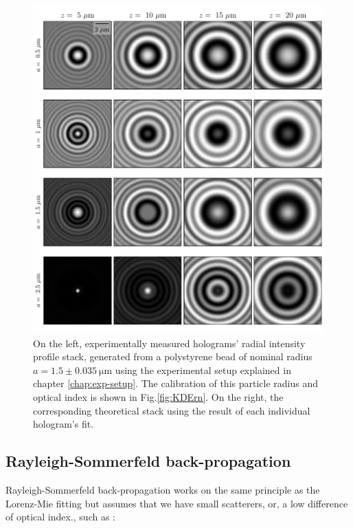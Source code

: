 \begin{figure}
	\centering
	\includegraphics{02_body/chapter2/images/holo_size_exemple/holos_fix_n.pdf}
	\caption{On the left, experimentally measured  holograms' radial intensity profile stack, generated from a polystyrene bead of nominal radius $a = 1.5 \pm 0.035 ~ \mathrm{\mu m} $ using the experimental setup explained in chapter \ref{chap:exp-setup}. The calibration of this particle radius and optical index is shown in Fig.\ref{fig:KDErn}. On the right, the corresponding theoretical stack using the result of each individual hologram's fit.}
	\label{fig:holo_fix_n}
\end{figure}

\clearpage
\newpage

\subsection{Rayleigh-Sommerfeld back-propagation}





Rayleigh-Sommerfeld back-propagation \cite{wilson_3d_2012} works on the same principle as the Lorenz-Mie fitting but assumes that we have small scatterers, or, a low difference of optical index., such as :

